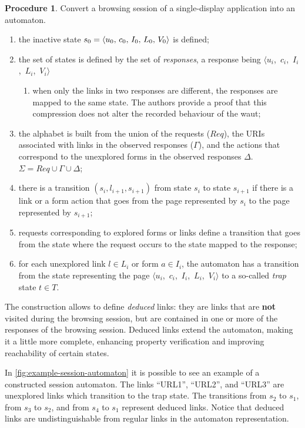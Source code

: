 \documentclass[a4paper,10pt]{article}
\newcommand{\res}[1][]{
  \ifthenelse{\equal{#1}{}}{\mbox{$\langle u$, $c$, $I$, $L$, $V\rangle$}}
  {\mbox{$\langle u_{#1}$, $c_{#1}$, $I_{#1}$, $L_{#1}$, $V_{#1}\rangle$}}
}
\theoremstyle{plain} %
\theoremstyle{definition}
\newtheorem{procedure}{Procedure}
\theoremstyle{remark}
\begin{document}
\begin{procedure}
  \label{browsing-session-to-automaton}
  Convert a browsing session of a single-display application into an automaton.

  \begin{enumerate}
    \item the inactive state $s_0 = \res[0]$ is defined;
    \item the set of states is defined by the set of \emph{responses}, a response being \res[i]
      \begin{enumerate}
        \item when only the links in two responses are different, the responses are mapped to the same state. The authors provide a proof that this compression does not alter the recorded behaviour of the \gls{waut};
      \end{enumerate}
    \item the alphabet is built from the union of the requests ($Req$), the URIs associated with links in the observed responses ($\Gamma$), and the actions that correspond to the unexplored forms in the observed responses $\Delta$. $\Sigma=Req\cup\Gamma\cup\Delta$;
    \item there is a transition $(s_i,l_{i+1},s_{i+1})$ from state $s_i$ to state $s_{i+1}$ if there is a link or a form action that goes from the page represented by $s_i$ to the page represented by $s_{i+1}$;
    \item requests corresponding to explored forms or links define a transition that goes from the state where the request occurs to the state mapped to the response;
    \item for each unexplored link $l \in L_i$ or form $a \in I_i$, the automaton has a transition from the state representing the page \res[i] to a so-called \textit{trap} state $t \in T$.
  \end{enumerate}
\end{procedure}

The construction allows to define \emph{deduced} links: they are links that are \textbf{not} visited during the browsing session, but are contained in one or more of the responses of the browsing session. Deduced links extend the automaton, making it a little more complete, enhancing property verification and improving reachability of certain states.

In \cref{fig:example-session-automaton} it is possible to see an example of a constructed session automaton. The links ``URL1'', ``URL2'', and ``URL3'' are unexplored links which transition to the trap state. The transitions from $s_2$ to $s_1$, from $s_3$ to $s_2$, and from $s_4$ to $s_1$ represent deduced links. Notice that deduced links are undistinguishable from regular links in the automaton representation.
\end{document}
